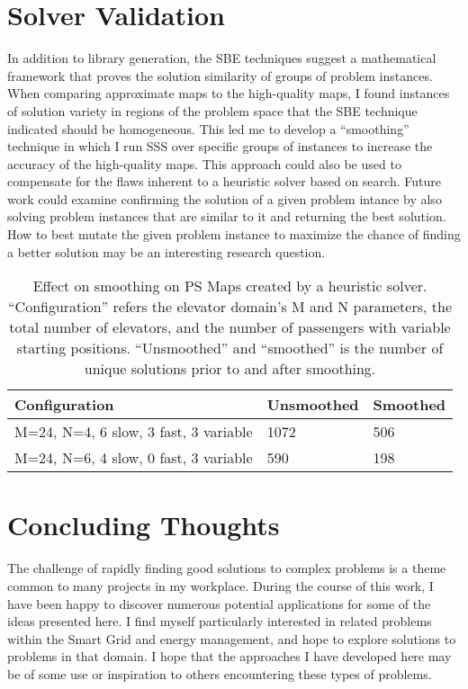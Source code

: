 
\section{Solver Validation}
In addition to library generation, the SBE techniques suggest a mathematical framework that proves the solution similarity of groups of problem instances.   When comparing approximate maps to the high-quality maps, I found instances of solution variety in regions of the problem space that the SBE technique indicated should be homogeneous.  This led me to develop a ``smoothing'' technique in which I run SSS over specific groups of instances to increase the accuracy of the high-quality maps.   This approach could also be used to compensate for the flaws inherent to a heuristic solver based on search.  Future work could examine confirming the solution of a given problem intance by also solving problem instances that are similar to it and returning the best solution.  How to best mutate the given problem instance to maximize the chance of finding a better solution may be an interesting research question.


\begin{table}
\begin{center}
  \begin{tabular}{|p{4.5cm}|p{3cm}|p{3cm}|}
    \hline
    \textbf{Configuration} & \textbf{Unsmoothed} & \textbf{Smoothed} \\ \hline
    M=24, N=4, 6 slow, 3 fast, 3 variable & 1072 & 506 \\ \hline
    M=24, N=6, 4 slow, 0 fast, 3 variable & 590  & 198 \\ \hline
    \hline
  \end{tabular}
  \caption{Effect on smoothing on PS Maps created by a heuristic solver. ``Configuration'' refers the elevator domain's M and N parameters, the total number of elevators, and the number of passengers with variable starting positions.  ``Unsmoothed'' and ``smoothed'' is the number of unique solutions prior to and after smoothing.}
  \label{tab:smoothing}
\end{center}
\end{table}


\section{Concluding Thoughts}

The challenge of rapidly finding good solutions to complex problems is a theme common to many projects in my workplace.  During the course of this work, I have been happy to discover numerous potential applications for some of the ideas presented here.  I find myself particularly interested in related problems within the Smart Grid and energy management, and hope to explore solutions to problems in that domain.  I hope that the approaches I have developed here may be of some use or inspiration to others encountering these types of problems.
